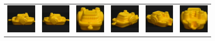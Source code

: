 \begin{figure}[p]
\begin{tabular}{cccccc}
\includegraphics[width=2cm]{coil/beeld-12.eps} &
\includegraphics[width=2cm]{coil/beeld-13.eps} &
\includegraphics[width=2cm]{coil/beeld-14.eps} &
\includegraphics[width=2cm]{coil/beeld-15.eps} &
\includegraphics[width=2cm]{coil/beeld-16.eps} &
\includegraphics[width=2cm]{coil/beeld-17.eps} \\


\end{tabular}
\end{figure}
